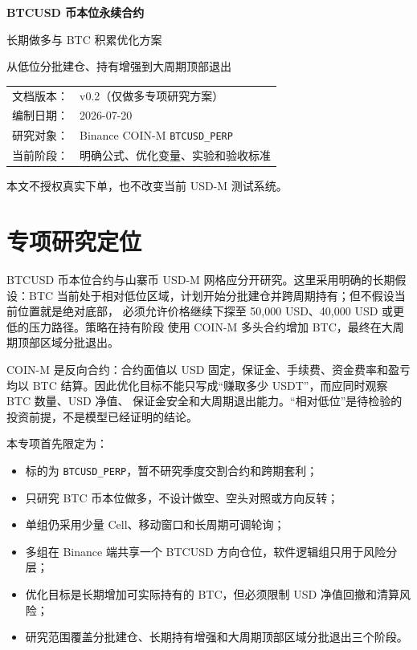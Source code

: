 \documentclass[11pt,a4paper,fontset=none]{ctexart}
\begin{document}
\begin{titlepage}
  \centering
  \vspace*{3.2cm}
  {\Huge\bfseries BTCUSD 币本位永续合约\par}
  \vspace{0.6cm}
  {\LARGE 长期做多与 BTC 积累优化方案\par}
  \vspace{1.0cm}
  {\large 从低位分批建仓、持有增强到大周期顶部退出\par}
  \vfill
  \begin{tabular}{rl}
    文档版本： & v0.2（仅做多专项研究方案） \\
    编制日期： & 2026-07-20 \\
    研究对象： & Binance COIN-M \texttt{BTCUSD\_PERP} \\
    当前阶段： & 明确公式、优化变量、实验和验收标准 \\
  \end{tabular}
  \vfill
  {\small 本文不授权真实下单，也不改变当前 USD-M 测试系统。\par}
\end{titlepage}

\tableofcontents
\clearpage
{}

\section{专项研究定位}

BTCUSD 币本位合约与山寨币 USD-M 网格应分开研究。这里采用明确的长期假设：BTC
当前处于相对低位区域，计划开始分批建仓并跨周期持有；但不假设当前位置就是绝对底部，
必须允许价格继续下探至 50,000 USD、40,000 USD 或更低的压力路径。策略在持有阶段
使用 COIN-M 多头合约增加 BTC，最终在大周期顶部区域分批退出。

COIN-M 是反向合约：合约面值以 USD 固定，保证金、手续费、资金费率和盈亏均以 BTC
结算。因此优化目标不能只写成“赚取多少 USDT”，而应同时观察 BTC 数量、USD 净值、
保证金安全和大周期退出能力。“相对低位”是待检验的投资前提，不是模型已经证明的结论。

本专项首先限定为：

\begin{itemize}
  \item 标的为 \texttt{BTCUSD\_PERP}，暂不研究季度交割合约和跨期套利；
  \item 只研究 BTC 币本位做多，不设计做空、空头对照或方向反转；
  \item 单组仍采用少量 Cell、移动窗口和长周期可调轮询；
  \item 多组在 Binance 端共享一个 BTCUSD 方向仓位，软件逻辑组只用于风险分层；
  \item 优化目标是长期增加可实际持有的 BTC，但必须限制 USD 净值回撤和清算风险；
  \item 研究范围覆盖分批建仓、长期持有增强和大周期顶部区域分批退出三个阶段。
\end{itemize}
\end{document}
